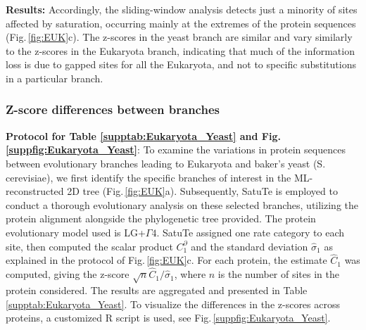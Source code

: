 \begin{appendices}
\medskip
 
\noindent \textbf{Results:} Accordingly, the sliding-window analysis detects just a minority of sites affected by saturation, occurring mainly at the extremes of the protein sequences (Fig.\,\ref{fig:EUK}c). 
The z-scores in the yeast branch are similar and vary similarly to the z-scores in the Eukaryota branch, indicating that much of the information loss is due to gapped sites for all the Eukaryota, and not to specific substitutions in a particular branch. 

\bigskip

\subsubsection{Z-score differences between branches}\label{suppsec:2DT_branch_zscore_diffs}

\noindent \textbf{Protocol for  Table \ref{supptab:Eukaryota_Yeast}  and Fig.\,\ref{suppfig:Eukaryota_Yeast}}:
 To examine the variations in protein sequences between evolutionary branches leading to Eukaryota and baker's yeast (S. cerevisiae), we first identify the specific branches of interest in the ML-reconstructed 2D tree (Fig.\,\ref{fig:EUK}a). Subsequently, SatuTe is employed to conduct a thorough evolutionary analysis on these selected branches, utilizing the protein alignment alongside the phylogenetic tree provided. The protein evolutionary model used is LG+$\Gamma 4$. SatuTe assigned one rate category to each site, then computed the scalar product $C_1^\partial$  and the  standard deviation  $\hat{\sigma}_1$ as explained in the protocol of Fig.\,\ref{fig:EUK}c. For each protein, the estimate $\hat{C}_1$ was computed, giving the z-score $\sqrt{n}\hat{C}_1/\hat{\sigma}_1$, where $n$ is the number of sites in the protein considered. The results are aggregated and presented in Table \ref{supptab:Eukaryota_Yeast}. To visualize the differences in the z-scores across proteins, a customized R script is used, see Fig.\,\ref{suppfig:Eukaryota_Yeast}.



\end{appendices}
